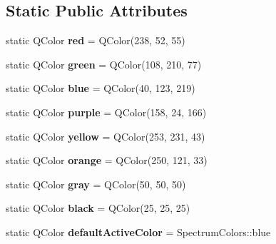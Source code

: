 \subsection*{Static Public Attributes}
\begin{DoxyCompactItemize}
\item 
\mbox{\label{class_spectrum_colors_a359b7bc813a9258cf7082eace9016d78}} 
static Q\+Color {\bfseries red} = Q\+Color(238, 52, 55)
\item 
\mbox{\label{class_spectrum_colors_afb33176dd84cfdc82e9dff851e535690}} 
static Q\+Color {\bfseries green} = Q\+Color(108, 210, 77)
\item 
\mbox{\label{class_spectrum_colors_a18b16740d8f10e1d205d1ca9b8d5626f}} 
static Q\+Color {\bfseries blue} = Q\+Color(40, 123, 219)
\item 
\mbox{\label{class_spectrum_colors_ac813cd6234f425b5112922e6e6048f47}} 
static Q\+Color {\bfseries purple} = Q\+Color(158, 24, 166)
\item 
\mbox{\label{class_spectrum_colors_a59a0d97dc34e6f54bd482f605d35a408}} 
static Q\+Color {\bfseries yellow} = Q\+Color(253, 231, 43)
\item 
\mbox{\label{class_spectrum_colors_a96e1ca692255c578b353a2121ea159e9}} 
static Q\+Color {\bfseries orange} = Q\+Color(250, 121, 33)
\item 
\mbox{\label{class_spectrum_colors_a19aff1c3818517ce3f03b6ed7c313e49}} 
static Q\+Color {\bfseries gray} = Q\+Color(50, 50, 50)
\item 
\mbox{\label{class_spectrum_colors_a19687d3a9df1ed053a6b29a30a000d6f}} 
static Q\+Color {\bfseries black} = Q\+Color(25, 25, 25)
\item 
\mbox{\label{class_spectrum_colors_a55d3300664680aa06db23cd98cff4477}} 
static Q\+Color {\bfseries default\+Active\+Color} = Spectrum\+Colors\+::blue
\item 
\mbox{\label{class_spectrum_colors_a24ea777602c5e80959b69771782f500b}} 

\end{DoxyCompactItemize}
